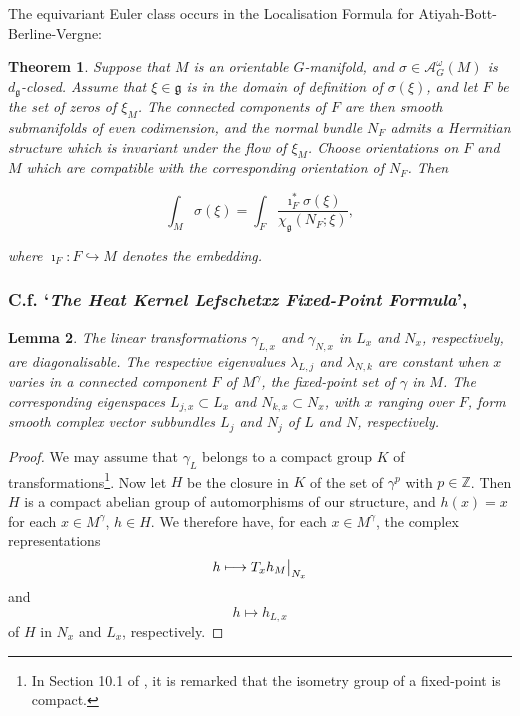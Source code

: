 \documentclass{article}
\newtheorem{theorem}{Theorem}[section]
\newtheorem{lemma}[theorem]{Lemma}
\newcommand{\w}{\omega}
\newcommand{\ZZ}{\mathbb{Z}}
\newcommand{\mcA}{\mathcal{A}}
\newcommand{\mfg}{\mathfrak{g}}
\newcommand\restr[2]{{%
		\left.\kern-\nulldelimiterspace %
		#1 %
		\vphantom{\big|} %
		\right|_{#2} %
}}
\begin{document}
The equivariant Euler class occurs in the Localisation Formula for Atiyah-Bott-Berline-Vergne:

\begin{theorem}
	Suppose that $M$ is an orientable $G$-manifold, and $\sigma \in \mcA_{G}^{\w}(M)$ is $d_{\mfg}$-closed. Assume that $\xi \in \mfg$ is in the domain of definition of $\sigma(\xi)$, and let $F$ be the set of zeros of $\xi_{M}$. The connected components of $F$ are then smooth submanifolds of even codimension, and the normal bundle $N_{F}$ admits a Hermitian structure which is invariant under the flow of $\xi_{M}$. Choose orientations on $F$ and $M$ which are compatible with the corresponding orientation of $N_{F}$. Then
	
	\begin{equation*}
		\int_{M} \sigma(\xi) = \int_{F} \frac{\imath_{F}^{\ast} \sigma(\xi) }{\chi_{\mfg}(N_{F}; \xi)},
	\end{equation*}

	where $\imath_{F} : F \hookrightarrow M$ denotes the embedding.
\end{theorem}
	
	
	\subsubsection{C.f. `\emph{The Heat Kernel Lefschetxz Fixed-Point Formula}', \cite{Duistermaat2011}}\label{subsubsec:Duistermaat}
	
	\begin{lemma}
		The linear transformations $\gamma_{L,x}$ and $\gamma_{N,x}$ in $L_{x}$ and $N_{x}$, respectively, are diagonalisable. The respective eigenvalues $\lambda_{L,j}$ and $\lambda_{N,k}$ are constant when $x$ varies in a connected component $F$ of $M^{\gamma}$, the fixed-point set of $\gamma$ in $M$. The corresponding eigenspaces $L_{j,x} \subset L_{x}$ and $N_{k,x} \subset N_{x}$, with $x$ ranging over $F$, form smooth complex vector subbundles $L_{j}$ and $N_{j}$ of $L$ and $N$, respectively.
	\end{lemma}

\begin{proof}
	We may assume that $\gamma_{L}$ belongs to a compact group $K$ of transformations\footnote{In Section 10.1 of \cite{Duistermaat2011}, it is remarked that the isometry group of a fixed-point is compact.}. Now let $H$ be the closure in $K$ of the set of $\gamma^{p}$ with $p \in \ZZ$. Then $H$ is a compact abelian group of automorphisms of our structure, and $h(x) = x$ for each $x \in M^{\gamma}$, $h \in H$. We therefore have, for each $x \in M^{\gamma}$, the complex representations
	\begin{equation*}
		h \longmapsto \restr{T_{x}h_{M}}{N_{x}}
	\end{equation*}
	and
	\begin{equation*}
		h \longmapsto h_{L,x}
	\end{equation*}
	of $H$ in $N_{x}$ and $L_{x}$, respectively.
	
	
\end{proof}
	
\end{document}
